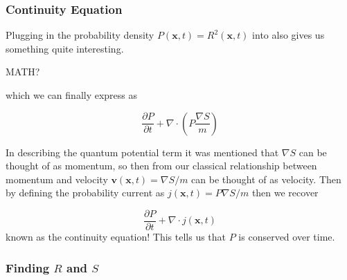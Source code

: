 \subsubsection{Continuity Equation}
Plugging in the probability density $P(\mathbf{x},t) = R^2(\mathbf{x},t)$ into  also gives us something quite interesting.

MATH?

which we can finally express as 

\begin{equation}
\label{ProbCurrent}
\frac{\partial P}{\partial t} + \nabla \cdot \left( P \frac{\nabla S}{m} \right)
\end{equation}

In describing the quantum potential term it was mentioned that $\nabla S$ can be thought of as momentum, so then from our classical relationship between momentum and velocity  $\textbf{v}(\textbf{x},t)=\nabla S/m$ can be thought of as velocity. Then by defining the probability current as $j(\mathbf{x},t) = P\nabla S/m$ then we recover

\begin{equation}
\label{ProbCurrent}
\frac{\partial P}{\partial t} + \nabla \cdot j(\mathbf{x},t)
\end{equation}
known as the continuity equation! This tells us that $P$ is conserved over time.

\subsubsection{Finding $R$ and $S$}

